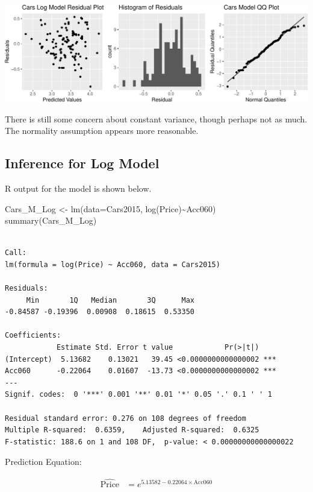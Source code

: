 \documentclass[
  letterpaper,
  DIV=11,
  numbers=noendperiod]{scrreprt}
\newenvironment{Shaded}{\begin{snugshade}}{\end{snugshade}}
\newcommand{\AttributeTok}[1]{\textcolor[rgb]{0.40,0.45,0.13}{#1}}
\newcommand{\FunctionTok}[1]{\textcolor[rgb]{0.28,0.35,0.67}{#1}}
\newcommand{\NormalTok}[1]{\textcolor[rgb]{0.00,0.23,0.31}{#1}}
\newcommand{\OtherTok}[1]{\textcolor[rgb]{0.00,0.23,0.31}{#1}}
\newcommand{\SpecialCharTok}[1]{\textcolor[rgb]{0.37,0.37,0.37}{#1}}
\begin{document}
\includegraphics{Ch5_files/figure-pdf/unnamed-chunk-14-1.pdf}

There is still some concern about constant variance, though perhaps not
as much. The normality assumption appears more reasonable.

\subsection{Inference for Log Model}\label{inference-for-log-model}

R output for the model is shown below.

\begin{Shaded}
\begin{Highlighting}[]
\NormalTok{Cars\_M\_Log }\OtherTok{\textless{}{-}} \FunctionTok{lm}\NormalTok{(}\AttributeTok{data=}\NormalTok{Cars2015, }\FunctionTok{log}\NormalTok{(Price)}\SpecialCharTok{\textasciitilde{}}\NormalTok{Acc060)}
\FunctionTok{summary}\NormalTok{(Cars\_M\_Log)}
\end{Highlighting}
\end{Shaded}

\begin{verbatim}

Call:
lm(formula = log(Price) ~ Acc060, data = Cars2015)

Residuals:
     Min       1Q   Median       3Q      Max 
-0.84587 -0.19396  0.00908  0.18615  0.53350 

Coefficients:
            Estimate Std. Error t value            Pr(>|t|)    
(Intercept)  5.13682    0.13021   39.45 <0.0000000000000002 ***
Acc060      -0.22064    0.01607  -13.73 <0.0000000000000002 ***
---
Signif. codes:  0 '***' 0.001 '**' 0.01 '*' 0.05 '.' 0.1 ' ' 1

Residual standard error: 0.276 on 108 degrees of freedom
Multiple R-squared:  0.6359,    Adjusted R-squared:  0.6325 
F-statistic: 188.6 on 1 and 108 DF,  p-value: < 0.00000000000000022
\end{verbatim}

Prediction Equation:

\[
\begin{aligned}
\widehat{\text{Price}} & = e^{5.13582-0.22064 \times \text{Acc060}}
\end{aligned}
\]
\end{document}
